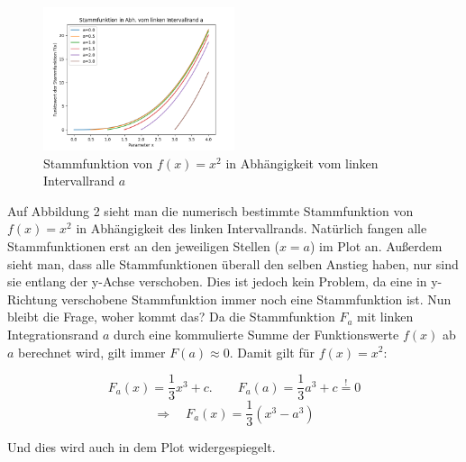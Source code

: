 \documentclass{article}
\begin{document}
	\begin{figure}
		\centering
		\includegraphics[width=0.5\textwidth]{fig2}
		\caption{Stammfunktion von $f(x) = x^2$ in Abhängigkeit vom linken Intervallrand $a$}
	\end{figure}

	Auf Abbildung 2 sieht man die numerisch bestimmte Stammfunktion von $f(x) = x^2$ in Abhängigkeit des linken Intervallrands. Natürlich fangen alle Stammfunktionen erst an den jeweiligen Stellen ($x=a$) im Plot an. Außerdem sieht man, dass alle Stammfunktionen überall den selben Anstieg haben, nur sind sie entlang der y-Achse verschoben. Dies ist jedoch kein Problem, da eine in y-Richtung verschobene Stammfunktion immer noch eine Stammfunktion ist. Nun bleibt die Frage, woher kommt das? Da die Stammfunktion $F_a$ mit linken Integrationsrand $a$ durch eine kommulierte Summe der Funktionswerte $f(x)$ ab $a$ berechnet wird, gilt immer $F(a) \approx 0$. Damit gilt für $f(x) = x^2$:
	
	$$F_a(x) = \frac{1}{3}x^3 + c.\qquad F_a(a) = \frac{1}{3}a^3 + c \stackrel{!}{=} 0$$
	$$\Rightarrow\quad F_a(x) = \frac{1}{3}(x^3 - a^3)$$
	
	Und dies wird auch in dem Plot widergespiegelt.
\end{document}
